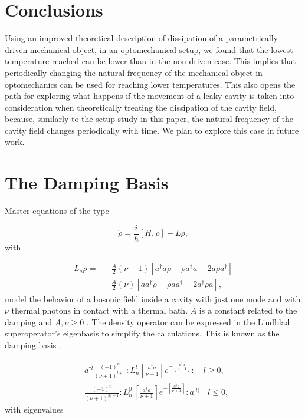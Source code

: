 \documentclass[reprint, amsmath,amssymb, aps,pra]{revtex4-1}
\begin{document}
\section{Conclusions}\label{ConCl}

Using an improved theoretical description of dissipation of a
parametrically driven mechanical object, in an optomechanical setup,
we found that the lowest temperature reached can be lower than in the
non-driven case. This implies that periodically changing the natural
frequency of the mechanical object in optomechanics can be used for
reaching lower temperatures. This also opens the path for exploring
what happens if the movement of a leaky cavity is taken into
consideration when theoretically treating the dissipation of the
cavity field, because, similarly to the setup study in this paper, the
natural frequency of the cavity field changes periodically with time.
We plan to explore this case in future work.
 
\appendix

\section{The Damping Basis}

Master equations of the type 

\begin{equation}
\dot{\rho} = \frac{i}{\hbar}[H,\rho]+L\rho, 
\end{equation} with

\begin{align}\label{EMField}
L_a \rho =& - \frac{A}{2}(\nu + 1)[a^\dagger a\rho + \rho a^\dagger a -2a\rho a^\dagger] \nonumber \\
 &- \frac{A}{2}(\nu)[ aa^\dagger\rho + \rho  aa^\dagger -2a^\dagger\rho a],
\end{align} model the behavior of a bosonic field inside a cavity with just one mode and with $\nu$ thermal photons in contact with a thermal bath. $A$ is a constant related to the damping and $A,\nu \geq 0$  \cite{EnglertDB}. The density operator can be expressed in the Lindblad superoperator's eigenbasis to simplify the calculations. This is known as the damping basis \cite{EnglertDB}.

\begin{align}\label{DefDB}
&a^{\dagger l}\frac{(-1)^n}{(\nu+1)^{l+1}}:L_n^l[\frac{a^\dagger a}{\nu+1}]e^{-[\frac{a^\dagger a}{\nu+1}]}:\quad l \geq 0, \\
&\frac{(-1)^n}{(\nu+1)^{|l|+1}}:L_n^{|l|}[\frac{a^\dagger a}{\nu+1}]e^{-[\frac{a^\dagger a}{\nu+1}]}:a^{|l|}\quad l \leq 0,
\end{align} with eigenvalues
\end{document}
